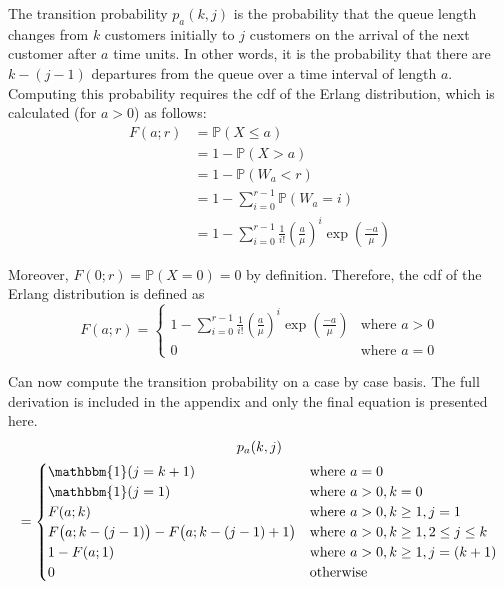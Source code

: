 The transition probability $p_{a} (k, j)$ is the probability that the queue length changes from $k$ customers initially to $j$ customers on the arrival of the next customer after $a$ time units. In other words, it is the probability that there are $k - (j - 1)$ departures from the queue over a time interval of length $a$. Computing this probability requires the cdf of the Erlang distribution, which is calculated (for $a > 0$) as follows:
\begin{align*}
	F (a; r) & = \mathbb{P} (X \leq a) \\
	& = 1 - \mathbb{P} (X > a) \\
	& = 1 - \mathbb{P} (W_{a} < r) \\
	& = 1 - \sum_{i = 0}^{r - 1} \mathbb{P} (W_{a} = i) \\
	& = 1 - \sum_{i = 0}^{r - 1} \frac{1}{i!} \left( \frac{a}{\mu} \right)^{i} \exp \left( \frac{-a}{\mu} \right)
\end{align*}

Moreover, $F (0; r) = \mathbb{P} (X = 0) = 0$ by definition. Therefore, the cdf of the Erlang distribution is defined as
\begin{equation}
	F (a; r) = \begin{cases} 1 - \sum_{i = 0}^{r - 1} \frac{1}{i!} \left( \frac{a}{\mu} \right)^{i} \exp \left( \frac{-a}{\mu} \right) & \text{where $a > 0$} \\ 0 & \text{where $a = 0$} \end{cases}
\end{equation}

Can now compute the transition probability on a case by case basis. The full derivation is included in the appendix and only the final equation is presented here.
\begin{multline}
	p_{a} (k, j) \\
	= \begin{cases}
		\mathbbm{1} (j = k + 1) & \text{where $a = 0$} \\
		\mathbbm{1} (j = 1) & \text{where $a > 0, k = 0$} \\
		F (a; k) & \text{where $a > 0, k \geq 1, j = 1$} \\
		F \big( a; k - (j - 1) \big) - F \big( a; k - (j - 1) + 1 \big) & \text{where $a > 0, k \geq 1, 2 \leq j \leq k$} \\
		1 - F (a; 1) & \text{where $a > 0, k \geq 1, j = (k + 1)$} \\
		0 & \text{otherwise}
	\end{cases}
\end{multline}

